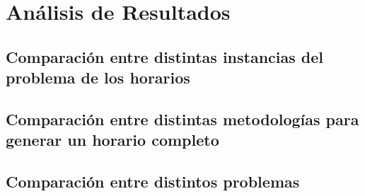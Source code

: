 \chapter{An\'alisis de Resultados}

\section{Comparaci\'on entre distintas instancias del problema de los horarios}

\section{Comparaci\'on entre distintas metodolog\'ias para generar un horario completo}

\section{Comparaci\'on entre distintos problemas}